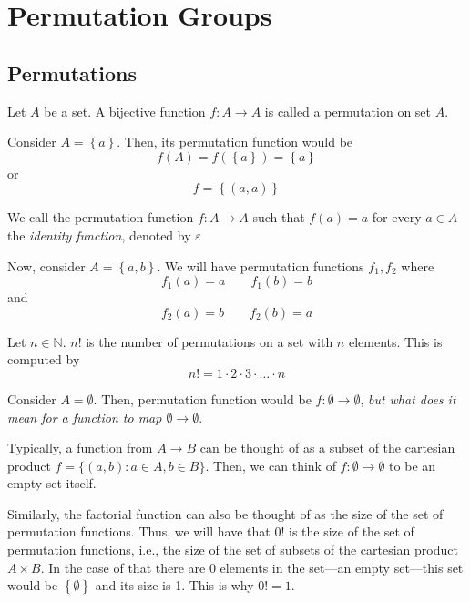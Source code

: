 \chapter{Permutation Groups}

\section{Permutations}

\begin{definition}[Permutation]
    Let \(A\) be a set. A bijective function \(f : A \to A\) is called a permutation on set \(A\).
\end{definition}

\begin{nexample}
    Consider \(A = \left\{a\right\}\). Then, its permutation function would be 
    \[
        f(A) = f(\left\{a\right\}) = \left\{a\right\}
    \]
    or
    \[
        f = \left\{(a, a)\right\}
    \]
\end{nexample}

\begin{remark}
    We call the permutation function \(f: A \to A\) such that \(f(a) = a\) for every \(a \in A\) the \textit{identity function}, denoted by \(\varepsilon\)
\end{remark}

\begin{nexample}
    Now, consider \(A = \left\{a, b\right\}\). We will have permutation functions \(f_1, f_2\) where
    \[
        f_1(a) = a \qquad f_1(b) = b
    \]
    and
    \[
        f_2(a) = b \qquad f_2(b) = a
    \]
\end{nexample}

\begin{definition}[Factorial]
    Let \(n \in \mathbb{N}\). \(n!\) is the number of permutations on a set with \(n\) elements. This is computed by
    \[
        n! = 1 \cdot 2 \cdot 3 \cdot \ldots \cdot n
    \]
\end{definition}

\begin{nexample}
    Consider \(A = \emptyset\). Then, permutation function would be \(f: \emptyset \to \emptyset\), \textit{but what does it mean for a function to map \(\emptyset \to \emptyset\)}.

    Typically, a function from \(A \to B\) can be thought of as a subset of the cartesian product \(f = \{(a, b): a \in A, b \in B\}\). Then, we can think of \(f: \emptyset \to \emptyset\) to be an empty set itself.

    Similarly, the factorial function can also be thought of as the size of the set of permutation functions. Thus, we will have that \(0!\) is the size of the set of permutation functions, i.e., the size of the set of subsets of the cartesian product \(A \times B\). In the case of that there are 0 elements in the set---an empty set---this set would be \(\left\{\emptyset\right\}\) and its size is 1. This is why \(0! = 1\).
\end{nexample}

